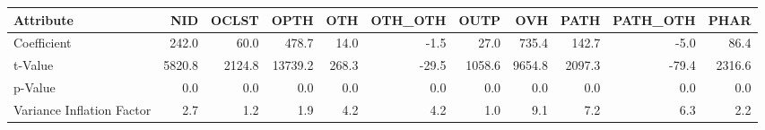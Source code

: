 \begin{tabular}{lrrrrrrrrrr}
\toprule
Attribute &     NID &   OCLST &     OPTH &    OTH &  OTH\_OTH &    OUTP &     OVH &    PATH &  PATH\_OTH &    PHAR \\
\midrule
Coefficient               &   242.0 &    60.0 &    478.7 &   14.0 &     -1.5 &    27.0 &   735.4 &   142.7 &      -5.0 &    86.4 \\
t-Value                   &  5820.8 &  2124.8 &  13739.2 &  268.3 &    -29.5 &  1058.6 &  9654.8 &  2097.3 &     -79.4 &  2316.6 \\
p-Value                   &     0.0 &     0.0 &      0.0 &    0.0 &      0.0 &     0.0 &     0.0 &     0.0 &       0.0 &     0.0 \\
Variance Inflation Factor &     2.7 &     1.2 &      1.9 &    4.2 &      4.2 &     1.0 &     9.1 &     7.2 &       6.3 &     2.2 \\
\bottomrule
\end{tabular}
